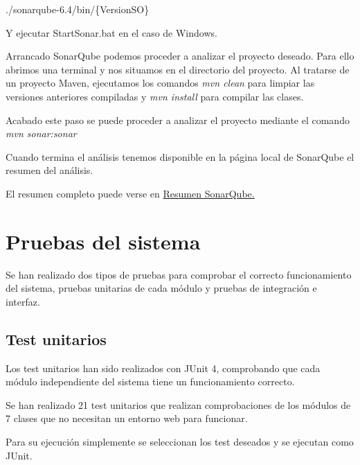 ./sonarqube-6.4/bin/\{VersionSO\}

Y ejecutar StartSonar.bat en el caso de Windows.


Arrancado SonarQube podemos proceder a analizar el proyecto deseado. Para ello abrimos una terminal y nos situamos en el directorio del proyecto. Al tratarse de un proyecto Maven, ejecutamos los comandos \emph{mvn clean} para limpiar las versiones anteriores compiladas y \emph{mvn install} para compilar las clases.


Acabado este paso se puede proceder a analizar el proyecto mediante el comando \emph{mvn sonar:sonar}


Cuando termina el análisis tenemos disponible en la página local de SonarQube el resumen del análisis.


El resumen completo puede verse en \href{https://sonarcloud.io/dashboard?id=UBUassistant}{Resumen SonarQube.}

\section{Pruebas del sistema}

Se han realizado dos tipos de pruebas para comprobar el correcto funcionamiento del sistema, pruebas unitarias de cada módulo y pruebas de integración e interfaz.

\subsection{Test unitarios}

Los test unitarios han sido realizados con JUnit 4, comprobando que cada módulo independiente del sistema tiene un funcionamiento correcto.

Se han realizado 21 test unitarios que realizan comprobaciones de los módulos de 7 clases que no necesitan un entorno web para funcionar. 


Para su ejecución simplemente se seleccionan los test deseados y se ejecutan como JUnit.


